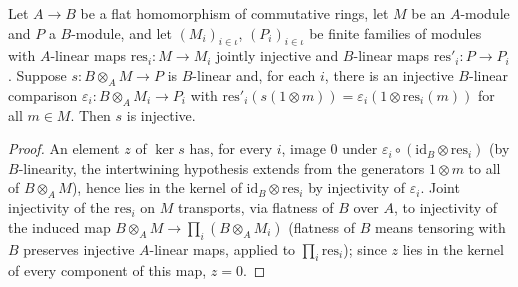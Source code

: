 \begin{lemma}
  \label{lem:section_base_change_injective_cover}
  \leanok
  Let \(A \to B\) be a flat homomorphism of commutative rings, let \(M\) be
  an \(A\)-module and \(P\) a \(B\)-module, and let \((M_i)_{i \in \iota}\),
  \((P_i)_{i \in \iota}\) be finite families of modules with \(A\)-linear
  maps \(\mathrm{res}_i : M \to M_i\) jointly injective and \(B\)-linear
  maps \(\mathrm{res}'_i : P \to P_i\). Suppose \(s : B \otimes_A M \to P\)
  is \(B\)-linear and, for each \(i\), there is an injective \(B\)-linear
  comparison \(\varepsilon_i : B \otimes_A M_i \to P_i\) with
  \(\mathrm{res}'_i(s(1 \otimes m)) = \varepsilon_i(1 \otimes
  \mathrm{res}_i(m))\) for all \(m \in M\). Then \(s\) is injective.
\end{lemma}
\begin{proof}\leanok
  An element \(z\) of \(\ker s\) has, for every \(i\), image \(0\) under
  \(\varepsilon_i \circ (\mathrm{id}_B \otimes \mathrm{res}_i)\) (by
  \(B\)-linearity, the intertwining hypothesis extends from the generators
  \(1 \otimes m\) to all of \(B \otimes_A M\)), hence lies in the kernel of
  \(\mathrm{id}_B \otimes \mathrm{res}_i\) by injectivity of \(\varepsilon_i\).
  Joint injectivity of the \(\mathrm{res}_i\) on \(M\) transports, via
  flatness of \(B\) over \(A\), to injectivity of the induced map
  \(B \otimes_A M \to \prod_i (B \otimes_A M_i)\) (flatness of \(B\) means
  tensoring with \(B\) preserves injective \(A\)-linear maps, applied to
  \(\prod_i \mathrm{res}_i\)); since \(z\) lies in the kernel of every
  component of this map, \(z = 0\).
\end{proof}

